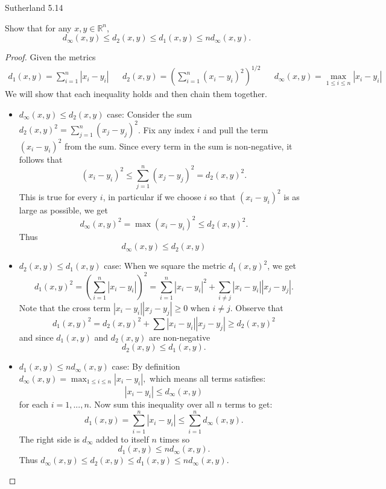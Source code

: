 \documentclass[minion]{homework}
\newcommand{\Reals}{\ensuremath{\mathbb R}}%
\begin{document}
\begin{problems}

\problem Sutherland 5.14

Show that for any $x,y\in\Reals^n$,
$$d_{\infty}(x,y) \leq d_2(x,y) \leq d_1(x,y) \leq nd_{\infty}(x,y).$$

\begin{proof}
  Given the metrics
  \begin{align*}
    d_1(x,y) = \sum^n_{i=1} |x_i - y_i| && d_2(x,y) = (\sum^n_{i=1}(x_i-y_i)^2)^{1/2} && d_\infty(x,y) = \max_{1 \leq i \leq n} |x_i-y_i|
  \end{align*}
  We will show that each inequality holds and then chain them together.
  \begin{itemize} \item$d_{\infty}(x,y) \leq d_2(x,y)$ case: Consider the sum $d_2(x,y)^2 = \sum^n_{j=1}(x_j - y_j)^2$. Fix any index $i$ and pull the term $(x_i - y_i)^2$ from the sum. Since every term in the sum is non-negative, it follows that
  $$(x_i - y_i)^2 \leq \sum^n_{j=1}(x_j - y_j)^2 = d_2(x,y)^2.$$
  This is true for every $i$, in particular if we choose $i$ so that $(x_i-y_i)^2$ is as large as possible, we get
  $$d_\infty(x,y)^2 = \max(x_i-y_i)^2 \leq d_2(x,y)^2.$$
  Thus
  $$d_\infty(x,y) \leq d_2(x,y)$$
\end{itemize}

\begin{itemize} \item $d_2(x,y) \leq d_1(x,y)$ case: When we square the metric $d_1(x,y)^2$, we get
  $$d_1(x,y)^2 = (\sum^n_{i=1}|x_i-y_i|)^2 = \sum^n_{i=1}|x_i-y_i|^2 + \sum_{i \neq j}|x_i - y_i||x_j-y_j|.$$
  Note that the cross term $|x_i-y_i||x_j-y_j| \geq 0$ when $i \neq j$. Observe that
  $$d_1(x,y)^2 = d_2(x,y)^2 + \sum|x_i-y_i||x_j-y_j| \geq d_2(x,y)^2$$
  and since $d_1(x,y)$ and $d_2(x,y)$ are non-negative
  $$d_2(x,y) \leq d_1(x,y).$$
\end{itemize}

\begin{itemize} \item $d_1(x,y) \leq n d_\infty(x,y)$ case: By definition $d_\infty(x,y) = \max_{1 \leq i \leq n}|x_i - y_i|,$ which means all terms satisfies:
  $$|x_i  - y_i| \leq d_\infty(x,y)$$
  for each $i = 1,...,n$. Now sum this inequality over all $n$ terms to get:
  $$d_1(x,y)=\sum^n_{i=1}|x_i-y_i| \leq \sum^n_{i=1}d_\infty(x,y).$$ 
  The right side is $d_\infty$ added to itself $n$ times so
  $$d_1(x,y) \leq nd_\infty(x,y).$$ 
  Thus $d_{\infty}(x,y) \leq d_2(x,y) \leq d_1(x,y) \leq nd_{\infty}(x,y).$
\end{itemize}
\end{proof}


\end{problems}
\end{document}
